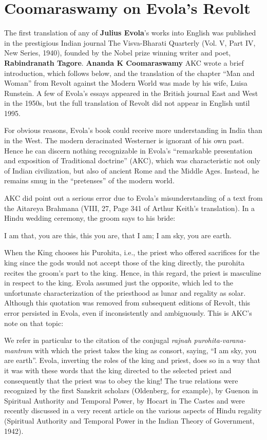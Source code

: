 \section{Coomaraswamy on Evola’s Revolt}

The first translation of any of \textbf{Julius Evola}'s works into English was published in the prestigious Indian journal The Visva-Bharati Quarterly (Vol. V, Part IV, New Series, 1940), founded by the Nobel prize winning writer and poet, \textbf{Rabindranath Tagore}. \textbf{Ananda K Coomaraswamy} AKC wrote a brief introduction, which follows below, and the translation of the chapter ``Man and Woman'' from Revolt against the Modern World was made by his wife, Luisa Runstein. A few of Evola's essays appeared in the British journal East and West in the 1950s, but the full translation of Revolt did not appear in English until 1995.

For obvious reasons, Evola's book could receive more understanding in India than in the West. The modern deracinated Westerner is ignorant of his own past. Hence he can discern nothing recognizable in Evola's ``remarkable presentation and exposition of Traditional doctrine'' (AKC), which was characteristic not only of Indian civilization, but also of ancient Rome and the Middle Ages. Instead, he remains smug in the ``pretenses'' of the modern world.

AKC did point out a serious error due to Evola's misunderstanding of a text from the Aitareya Brahmana (VIII, 27, Page 341 of Arthur Keith's translation). In a Hindu wedding ceremony, the groom says to his bride:

\begin{quotex}
I am that, you are this, this you are, that I am; I am sky, you are earth.
\end{quotex}


When the King chooses his Purohita, i.e., the priest who offered sacrifices for the king since the gods would not accept those of the king directly, the purohita recites the groom's part to the king. Hence, in this regard, the priest is masculine in respect to the king. Evola assumed just the opposite, which led to the unfortunate characterization of the priesthood as lunar and regality as solar. Although this quotation was removed from subsequent editions of Revolt, this error persisted in Evola, even if inconsistently and ambiguously. This is AKC's note on that topic:

\begin{quotex}
We refer in particular to the citation of the conjugal \emph{rajnah purohita-varana-mantram} with which the priest takes the king as consort, saying, ``I am sky, you are earth''. Evola, inverting the roles of the king and priest, does so in a way that it was with these words that the king directed to the selected priest and consequently that the priest was to obey the king! The true relations were recognized by the first Sanskrit scholars (Oldenberg, for example), by Guenon in Spiritual Authority and Temporal Power, by Hocart in The Castes and were recently discussed in a very recent article on the various aspects of Hindu regality (Spiritual Authority and Temporal Power in the Indian Theory of Government, 1942).
\end{quotex}


